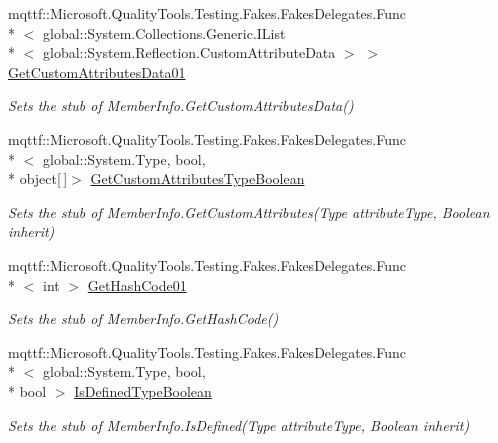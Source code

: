 \begin{DoxyCompactItemize}
mqttf\-::\-Microsoft.\-Quality\-Tools.\-Testing.\-Fakes.\-Fakes\-Delegates.\-Func\\*
$<$ global\-::\-System.\-Collections.\-Generic.\-I\-List\\*
$<$ global\-::\-System.\-Reflection.\-Custom\-Attribute\-Data $>$ $>$ \hyperlink{class_system_1_1_reflection_1_1_fakes_1_1_stub_member_info_ae88e400fdc980fbcd15c76329751cc24}{Get\-Custom\-Attributes\-Data01}
\begin{DoxyCompactList}\small\item\em Sets the stub of Member\-Info.\-Get\-Custom\-Attributes\-Data()\end{DoxyCompactList}\item 
mqttf\-::\-Microsoft.\-Quality\-Tools.\-Testing.\-Fakes.\-Fakes\-Delegates.\-Func\\*
$<$ global\-::\-System.\-Type, bool, \\*
object\mbox{[}$\,$\mbox{]}$>$ \hyperlink{class_system_1_1_reflection_1_1_fakes_1_1_stub_member_info_a1a4d1051c916a9217657e1403ff891bc}{Get\-Custom\-Attributes\-Type\-Boolean}
\begin{DoxyCompactList}\small\item\em Sets the stub of Member\-Info.\-Get\-Custom\-Attributes(\-Type attribute\-Type, Boolean inherit)\end{DoxyCompactList}\item 
mqttf\-::\-Microsoft.\-Quality\-Tools.\-Testing.\-Fakes.\-Fakes\-Delegates.\-Func\\*
$<$ int $>$ \hyperlink{class_system_1_1_reflection_1_1_fakes_1_1_stub_member_info_aab0aca05e75dc1213439d8d64429dac8}{Get\-Hash\-Code01}
\begin{DoxyCompactList}\small\item\em Sets the stub of Member\-Info.\-Get\-Hash\-Code()\end{DoxyCompactList}\item 
mqttf\-::\-Microsoft.\-Quality\-Tools.\-Testing.\-Fakes.\-Fakes\-Delegates.\-Func\\*
$<$ global\-::\-System.\-Type, bool, \\*
bool $>$ \hyperlink{class_system_1_1_reflection_1_1_fakes_1_1_stub_member_info_a39dee76f64c1b23616ba19839cd657ac}{Is\-Defined\-Type\-Boolean}
\begin{DoxyCompactList}\small\item\em Sets the stub of Member\-Info.\-Is\-Defined(\-Type attribute\-Type, Boolean inherit)\end{DoxyCompactList}\item 

\end{DoxyCompactItemize}
